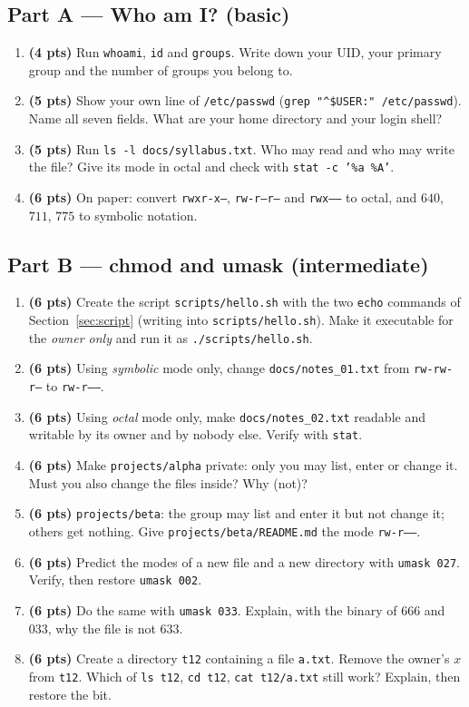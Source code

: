 \documentclass[11pt,a4paper]{article}
\newcommand{\cmd}[1]{\texttt{#1}}
\begin{document}
\subsection*{Part A --- Who am I? (basic)}
\begin{enumerate}[leftmargin=1.8em,label=\textbf{\arabic*.}]
  \item \textbf{(4 pts)} Run \cmd{whoami}, \cmd{id} and \cmd{groups}. Write down your UID, your primary group and the number of groups you belong to.
  \item \textbf{(5 pts)} Show your own line of \texttt{/etc/passwd} (\cmd{grep "\^{}\$USER:" /etc/passwd}). Name all seven fields. What are your home directory and your login shell?
  \item \textbf{(5 pts)} Run \cmd{ls -l docs/syllabus.txt}. Who may read and who may write the file? Give its mode in octal and check with \cmd{stat -c '\%a \%A'}.
  \item \textbf{(6 pts)} On paper: convert \texttt{rwxr-x---}, \texttt{rw-r--r--} and \texttt{rwx------} to octal, and $640$, $711$, $775$ to symbolic notation.
\end{enumerate}

\subsection*{Part B --- chmod and umask (intermediate)}
\begin{enumerate}[leftmargin=1.8em,label=\textbf{\arabic*.},resume]
  \item \textbf{(6 pts)} Create the script \texttt{scripts/hello.sh} with the two \cmd{echo} commands of Section~\ref{sec:script} (writing into \texttt{scripts/hello.sh}). Make it executable for the \emph{owner only} and run it as \cmd{./scripts/hello.sh}.
  \item \textbf{(6 pts)} Using \emph{symbolic} mode only, change \texttt{docs/notes\_01.txt} from \texttt{rw-rw-r--} to \texttt{rw-r-----}.
  \item \textbf{(6 pts)} Using \emph{octal} mode only, make \texttt{docs/notes\_02.txt} readable and writable by its owner and by nobody else. Verify with \cmd{stat}.
  \item \textbf{(6 pts)} Make \texttt{projects/alpha} private: only you may list, enter or change it. Must you also change the files inside? Why (not)?
  \item \textbf{(6 pts)} \texttt{projects/beta}: the group may list and enter it but not change it; others get nothing. Give \texttt{projects/beta/README.md} the mode \texttt{rw-r-----}.
  \item \textbf{(6 pts)} Predict the modes of a new file and a new directory with \texttt{umask 027}. Verify, then restore \texttt{umask 002}.
  \item \textbf{(6 pts)} Do the same with \texttt{umask 033}. Explain, with the binary of $666$ and $033$, why the file is not $633$.
  \item \textbf{(6 pts)} Create a directory \texttt{t12} containing a file \texttt{a.txt}. Remove the owner's $x$ from \texttt{t12}. Which of \cmd{ls t12}, \cmd{cd t12}, \cmd{cat t12/a.txt} still work? Explain, then restore the bit.
\end{enumerate}
\end{document}
